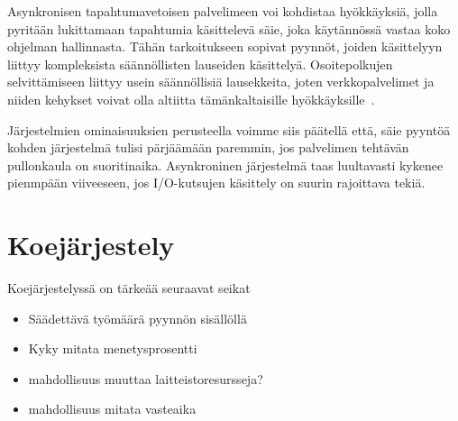 \documentclass[12pt]{article}
\begin{document}
Asynkronisen tapahtumavetoisen palvelimeen voi kohdistaa hyökkäyksiä, jolla pyritään 
lukittamaan tapahtumia käsittelevä säie, joka käytännössä vastaa koko ohjelman hallinnasta.
Tähän tarkoitukseen sopivat pyynnöt,
joiden käsittelyyn liittyy kompleksista säännöllisten lauseiden käsittelyä.
Osoitepolkujen selvittämiseen liittyy usein säännöllisiä lausekkeita,
joten verkkopalvelimet ja niiden
kehykset voivat olla altiitta tämänkaltaisille hyökkäyksille~\cite{davis_case_2017}.

Järjestelmien ominaisuuksien perusteella voimme siis päätellä että,
säie pyyntöä kohden järjestelmä
tulisi pärjäämään paremmin, jos palvelimen tehtävän pullonkaula on suoritinaika.
Asynkroninen järjestelmä
taas luultavasti kykenee pienmpään viiveeseen, jos I/O-kutsujen käsittely on suurin rajoittava tekiä.
\section{Koejärjestely}
Koejärjestelyssä on tärkeää seuraavat seikat

\begin{itemize}
    \item Säädettävä työmäärä pyynnön sisällöllä
    \item Kyky mitata menetysprosentti
    \item mahdollisuus muuttaa laitteistoresursseja?
    \item mahdollisuus mitata vasteaika
\end{itemize}



\end{document}
